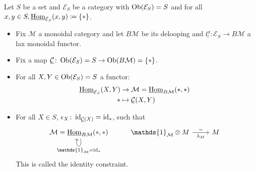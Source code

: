 \begin{exmp}
	Let $ S $ be a set and $ \mathcal{ E }_S $ be a category with $ \operatorname{Ob} ( \mathcal{ E }_S ) = S $ and for all $ x , y \in S, \underline{ \operatorname{Hom} }_{ \mathcal{ E }_S } ( x , y ) \coloneqq \{ *
	\} $.
	\begin{itemize}
		\item 	
		Fix $ \mathcal{ M } $ a monoidal category and let $ B \mathcal{ M } $ be its delooping and $ \underline{ \mathcal{ C } } \colon \mathcal{ E }_S \to B \mathcal{ M }$ a lax monoidal functor.
		
		\item 
		Fix a map $ \underline{ \mathcal{ C } } \colon \operatorname{Ob} ( \mathcal{ E }_S )= S \to \operatorname{Ob} ( B \mathcal{ M } ) = \{ * \}$.
		
		\item 
		For all $ X , Y \in \operatorname{Ob} ( \mathcal{ E }_S ) = S $ a functor: 
		\begin{align*}
				\underline{ \operatorname{Hom} }_{ \mathcal{ E }_S } ( X , Y )
				&\to
				\mathcal{ M } = \underline{ \operatorname{Hom} }_{ B \mathcal{ M } } ( * , * )
				\\
				*
				&\mapsto
				\underline{ \mathcal{ C } } ( X  , Y )
		\end{align*} 
		
		\item 
		For all $ X  \in S $, $ \epsilon_X \colon \operatorname{id}_{ \underline{ \mathcal{ C } } ( X ) } = \operatorname{id}_*$, such that 
		\[
		\begin{tikzcd}
			\mathcal{ M } = \underline{ \Hom }_{ B \mathcal{ M } } ( * , * )
			\ar[loop below, " \mathds{ 1 }_{ \mathcal{ M } } = \id_* "]
			&
			\mathds{ 1 }_{ \mathcal{ M } } \otimes M 
			\ar[r, "\sim", "\lambda_M"']
			&
			M
		\end{tikzcd}
		\]
		This is called the identity constraint.
		

\end{itemize}
\end{exmp}
